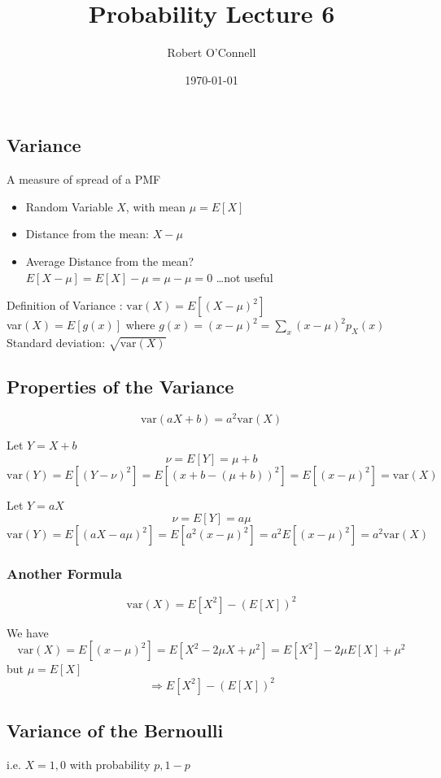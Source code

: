 \documentclass{article}
\title{\textbf{Probability Lecture 6}}
\author{Robert O'Connell}
\date{\today}
\begin{document}
\maketitle
\subsection*{Variance}
A measure of spread of a PMF
\\

\begin{itemize}
    \item Random Variable \(X\), with mean \(\mu = E[X]\)
    \item Distance from the mean: \(X - \mu\)
    \item Average Distance from the mean? \\
\(E[X-\mu] = E[X] - \mu = \mu - \mu = 0\) \dots not useful
\end{itemize}

Definition of Variance : \(\text{var}(X) = E[(X-\mu)^2]\)
\\

var\((X) = E[g(x)]\) where \(g(x) = (x-\mu)^2 = \sum_x (x-\mu)^2 p_X(x)\)
\\

Standard deviation: \(\sqrt{\text{var}(X)}\)

\subsection*{Properties of the Variance}
\[
\text{var}(aX+b) = a^2\text{var}(X)
\]

Let \(Y = X+b\)
\[
\nu = E[Y] = \mu + b
\]
\[
\text{var}(Y) = E[(Y-\nu)^2] = E[(x+b-(\mu +b))^2] = E[(x-\mu)^2] =\text{var}(X)
\]

Let \(Y = aX\)
\[
\nu = E[Y] = a\mu
\]
\[
\text{var}(Y) = E[(aX-a\mu)^2] = E[a^2(x-\mu)^2] = a^2E[(x-\mu)^2] = a^2\text{var}(X)
\]

\subsubsection*{Another Formula}
\[
\text{var}(X) = E[X^2] - (E[X])^2
\]

We have
\[
\text{var}(X) = E[(x-\mu)^2] = E[X^2 - 2\mu X + \mu^2] = E[X^2] -2\mu E[X] + \mu^2
\]
but \(\mu = E[X]\)
\[
\Rightarrow E[X^2] - (E[X])^2
\]

\subsection*{Variance of the Bernoulli}
i.e. \(X = 1 , 0\) with probability \(p, 1-p\)
\end{document}
